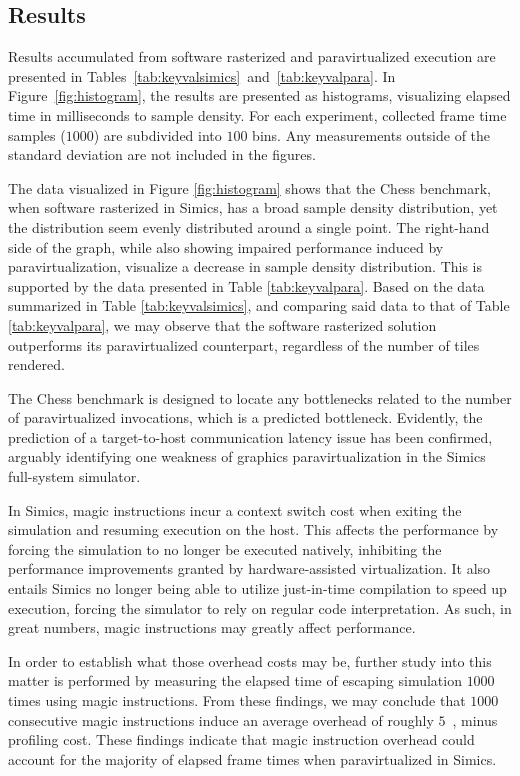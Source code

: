 \subsection{Results}
\label{sec:results}
Results accumulated from software rasterized and paravirtualized execution are presented in Tables~\ref{tab:keyvalsimics}~and~\ref{tab:keyvalpara}.
In Figure~\ref{fig:histogram}, the results are presented as histograms, visualizing elapsed time in milliseconds to sample density.
For each experiment, collected frame time samples ($1000$) are subdivided into $100$ bins.
Any measurements outside of the standard deviation are not included in the figures.



The data visualized in Figure \ref{fig:histogram} shows that the Chess benchmark, when software rasterized in Simics, has a broad sample density distribution, yet the distribution seem evenly distributed around a single point.
The right-hand side of the graph, while also showing impaired performance induced by paravirtualization, visualize a decrease in sample density distribution.
This is supported by the data presented in Table \ref{tab:keyvalpara}.
Based on the data summarized in Table \ref{tab:keyvalsimics}, and comparing said data to that of Table \ref{tab:keyvalpara}, we may observe that the software rasterized solution outperforms its paravirtualized counterpart, regardless of the number of tiles rendered.

The Chess benchmark is designed to locate any bottlenecks related to the number of paravirtualized invocations, which is a predicted bottleneck.
Evidently, the prediction of a target-to-host communication latency issue has been confirmed, arguably identifying one weakness of graphics paravirtualization in the Simics full-system simulator.

In Simics, magic instructions incur a context switch cost when exiting the simulation and resuming execution on the host.
This affects the performance by forcing the simulation to no longer be executed natively, inhibiting the performance improvements granted by hardware-assisted virtualization.
It also entails Simics no longer being able to utilize just-in-time compilation to speed up execution, forcing the simulator to rely on regular code interpretation.
As such, in great numbers, magic instructions may greatly affect performance.

In order to establish what those overhead costs may be, further study into this matter is performed by measuring the elapsed time of escaping simulation $1000$ times using magic instructions.
From these findings, we may conclude that $1000$ consecutive magic instructions induce an average overhead of roughly $5$~\milli\second , minus profiling cost.
These findings indicate that magic instruction overhead could account for the majority of elapsed frame times when paravirtualized in Simics.

